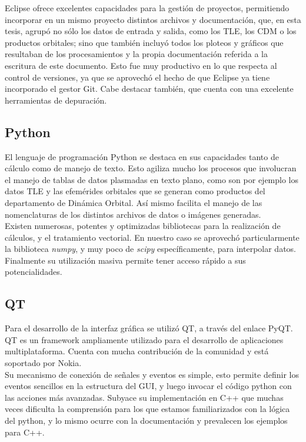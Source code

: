 Eclipse ofrece excelentes capacidades para la gesti\'on de proyectos, permitiendo incorporar en un mismo proyecto distintos archivos y documentaci\'on, que, en esta tesis, agrup\'o no s\'olo los datos de entrada y salida, como los TLE, los CDM o los productos orbitales; sino que tambi\'en incluy\'o todos los ploteos y gr\'aficos que resultaban de los procesamientos y la propia documentaci\'on referida a la escritura de este documento. Esto fue muy productivo en lo que respecta al control de versiones, ya que se aprovech\'o el hecho de que Eclipse ya tiene incorporado el gestor Git.
Cabe destacar también, que cuenta con una excelente herramientas de depuraci\'on.\\

\subsection*{Python}
El lenguaje de programaci\'on Python se destaca en sus capacidades tanto de c\'alculo como de manejo de texto. Esto agiliza mucho los procesos que involucran el manejo de tablas de datos plasmadas en texto plano, como son por ejemplo los datos TLE y las efem\'erides orbitales que se generan como productos del departamento de Din\'amica Orbital. As\'i mismo facilita el manejo de las nomenclaturas de los distintos archivos de datos o im\'agenes generadas.\\

Existen numerosas, potentes y optimizadas bibliotecas para la realizaci\'on de c\'alculos, y el tratamiento vectorial. En nuestro caso se aprovech\'o particularmente la biblioteca {\it{numpy}}, y muy poco de {\it{scipy}} espec\'ificamente, para interpolar datos.
Finalmente su utilizaci\'on masiva permite tener acceso r\'apido a sus potencialidades.\\

\subsection*{QT}
Para el desarrollo de la interfaz gr\'afica se utiliz\'o QT, a trav\'es del enlace PyQT.\\
QT es un framework ampliamente utilizado para el desarrollo de aplicaciones multiplataforma. Cuenta con mucha contribuci\'on de la comunidad y est\'a soportado por Nokia.\\

Su mecanismo de conexión de señales y eventos es simple, esto permite definir los eventos sencillos en la estructura del GUI, y luego invocar el c\'odigo python con las acciones m\'as avanzadas. Subyace su implementaci\'on en C++ que muchas veces dificulta la comprensi\'on para los que estamos familiarizados con la l\'ogica del python, y lo mismo ocurre con la documentaci\'on y prevalecen los ejemplos para C++.\\

